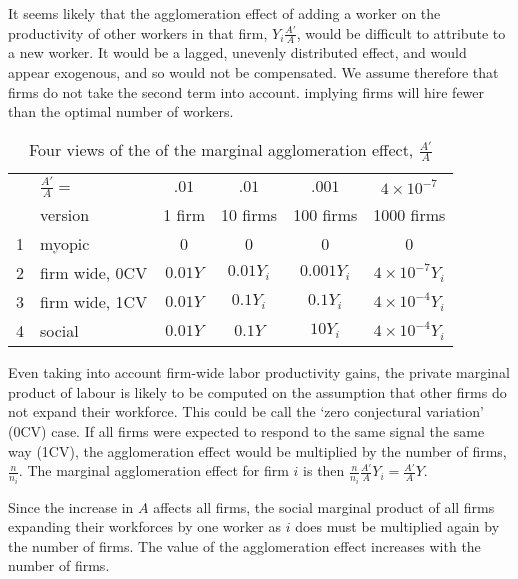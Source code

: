 It seems likely that the agglomeration effect of adding a worker on the productivity of other workers in that firm, $Y_i \frac{A'}{A}$, would be difficult to attribute to a new worker. It would be a lagged, unevenly distributed effect, and would appear exogenous, and so would not be compensated. We assume therefore that firms do not take the second term into account. %
implying firms will hire fewer than the optimal number of workers.
\begin{table}[htbp]
\caption{Four views of the of the marginal agglomeration effect, $\frac{A'}{A}$}
\begin{center}
\begin{tabular}{rlcccc}\small
    & 	\hspace{2cm}$\frac{A'}{A}=$	& $.01$ & $.01$ & $.001$  &  $4\times 10^{-7}$\\ \cline{3-4}
\   &  	version  		& 1 firm 		&10 firms		&100 firms 	& 1000 firms		\\ \hline%
 1 &myopic 		&0 			& 0			& 0       		&	0				\\
 2 &firm wide, 0CV 	& $0.01Y$		& $0.01Y_i$	& $0.001Y_i$	& $4\times 10^{-7}Y_i$	\\
 3 &firm wide, 1CV	& $0.01Y$		& $0.1Y_i	$	& $0.1Y_i$	&$4\times 10^{-4}Y_i$	\\
4  &social 			& $0.01Y$ 	&  $0.1Y$		& $10Y_i$		&$4\times 10^{-4}Y_i$	\\
 \hline
\end{tabular}
\end{center}
\label{table-marginal-agglomeration}
\end{table}%


Even taking into account firm-wide labor productivity gains, the private marginal product of labour is likely to be computed on the assumption that other firms do not expand  their workforce. This could be call the `zero conjectural variation' (0CV) case. If all firms  were expected to respond to the same signal the same way (1CV), the agglomeration effect  would be multiplied by the number of firms, $\frac{n }{n_i}$. The marginal agglomeration effect for firm $i$ is then $\frac{n }{n_i}\frac{A' }{A}Y_i =\frac{A' }{A}Y$. 

Since the increase in $A$ affects all firms, the  social marginal product of all firms expanding their  workforces by one worker as $i$ does must be multiplied again by the number of firms. The  value of the agglomeration effect  increases with the number of firms. 

